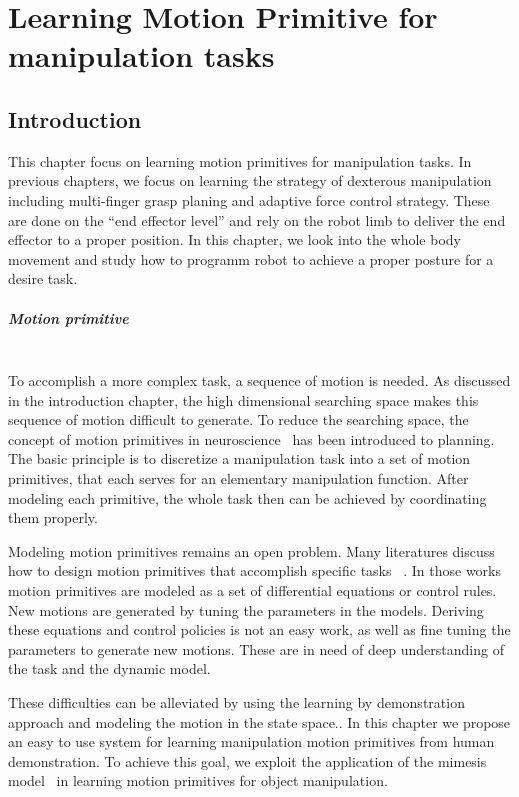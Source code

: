 \chapter{Learning Motion Primitive for manipulation tasks}
\label{cha5}

\section{Introduction}
\label{cha5:sec1}
This chapter focus on learning motion primitives for manipulation tasks. In previous chapters, we focus on learning the strategy of dexterous manipulation including multi-finger grasp planing and adaptive force control strategy. These are done on the ``end effector level'' and rely on the robot limb to deliver the end effector to a proper position. In this chapter, we look into the whole body movement and study how to programm robot to achieve a proper posture for a desire task.

\paragraph{Motion primitive} ~\\
To accomplish a more complex task, a sequence of motion is needed. As discussed in the introduction chapter, the high dimensional searching space makes this sequence of motion difficult to generate. To reduce the searching space, the concept of motion primitives in neuroscience~\citep{bizzi2008combining} has been introduced to planning. The basic principle is to discretize a manipulation task into a set of motion primitives, that each serves for an elementary manipulation function. After modeling each primitive, the whole task then can be achieved by coordinating them properly.

Modeling motion primitives remains an open problem. Many literatures discuss how to design motion primitives that accomplish specific tasks ~\citep{michelman1994forming,felip2012manipulation,ijspeert2013dynamical}. In those works motion primitives are modeled as a set of differential equations or control rules. New motions are generated by tuning the parameters in the models. Deriving these equations and control policies is not an easy work, as well as fine tuning the parameters to generate new motions. These are in need of deep understanding of the task and the dynamic model. 

These difficulties can be alleviated by using the learning by demonstration approach and modeling the motion in the state space.. In this chapter we propose an easy to use system for learning manipulation motion primitives from human demonstration. To achieve this goal, we exploit the application of the mimesis model~\citep{inamura2004embodied} in learning motion primitives for object manipulation.

